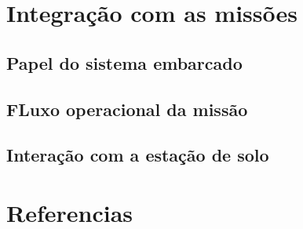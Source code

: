 \section{Integração com as missões}
\subsection{Papel do sistema embarcado}
\subsection{FLuxo operacional da missão}
\subsection{Interação com a estação de solo}

\section{Referencias}

